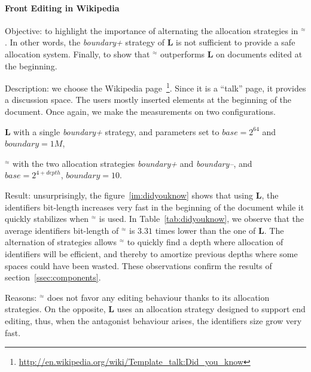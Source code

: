 \paragraph{Front Editing in Wikipedia}
\begin{asparadesc}
  
\item[Objective:] to highlight the importance of alternating the allocation
  strategies in \textbf{\NAME{}}$^\approx$. In other words, the
  \emph{boundary+} strategy of \textbf{L} is not sufficient to provide a safe
  allocation system. Finally, to show that \textbf{\NAME{}}$^\approx$
  outperforms \textbf{L} on documents edited at the beginning.

\item[Description:] we choose the Wikipedia
  page~\footnote{\url{http://en.wikipedia.org/wiki/Template_talk:Did_you_know}}. Since
  it is a ``talk'' page, it provides a discussion space. The users mostly
  inserted elements at the beginning of the document. Once again, we make the
  measurements on two configurations.
  \begin{inparaenum}[(1)]
    \item \textbf{L} with a single \emph{boundary+} strategy, and parameters
      set to $base=2^{64}$ and $boundary=1M$,
    \item \textbf{\NAME{}}$^\approx$ with the two allocation strategies
      \emph{boundary+} and \emph{boundary--}, and $base=2^{4+depth}$,
      $boundary=10$.
  \end{inparaenum}

\item[Result:] unsurprisingly, the figure~\ref{im:didyouknow} shows that using
  \textbf{L}, the identifiers bit-length increases very fast in the beginning
  of the document while it quickly stabilizes when \textbf{\NAME{}}$^\approx$
  is used. In Table~\ref{tab:didyouknow}, we observe that the average
  identifiers bit-length of \textbf{\NAME{}}$^\approx$ is $3.31$ times lower
  than the one of \textbf{L}.  The alternation of strategies allows
  \textbf{\NAME{}}$^\approx$ to quickly find a depth where allocation of
  identifiers will be efficient, and thereby to amortize previous depths where
  some spaces could have been wasted.  These observations confirm the results
  of section~\ref{ssec:components}.
  
  \item[Reasons:] \textbf{\NAME{}}$^\approx$ does not favor any editing
    behaviour thanks to its allocation strategies. On the opposite, \textbf{L}
    uses an allocation strategy designed to support end editing, thus, when
    the antagonist behaviour arises, the identifiers size grow very fast.
\end{asparadesc}

